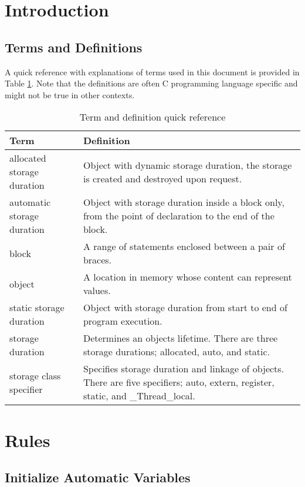 \documentclass{article}
\begin{document}
\section{Introduction}

\subsection{Terms and Definitions}

A quick reference with explanations of terms used in this document is provided in Table \ref{tab:terms-and-defs}. Note that the definitions are often C programming language specific and might not be true in other contexts. 

\begin{table}[h]
\begin{tabularx}{\textwidth}{lX}
\toprule
Term & Definition \\
\midrule
allocated storage duration & Object with dynamic storage duration, the storage is created and destroyed upon request. \\
automatic	storage duration &	Object with storage duration inside a block only, from the point of declaration to the end of the block. \\
block & A range of statements enclosed between a pair of braces. \\
object & A location in memory whose content can represent values. \\
static storage duration & Object with storage duration from start to end of program execution. \\ 
storage duration & Determines an objects lifetime. There are three storage durations; allocated, auto, and static. \\
storage class specifier & Specifies storage duration and linkage of objects. There are five specifiers; auto, extern, register, static, and \_Thread\_local. \\
\bottomrule
\end{tabularx}
\caption{Term and definition quick reference}
\label{tab:terms-and-defs}
\end{table}

\section{Rules}

\subsection{Initialize Automatic Variables}
\end{document}
